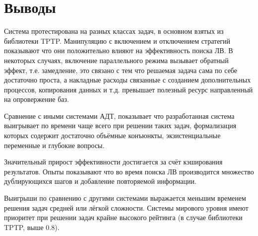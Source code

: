 \section{Выводы}
Система протестирована на разных классах задач, в основном взятых из библиотеки TPTP. Манипуляцию с включением и отключением стратегий показывают что они положительно влияют на эффективность поиска ЛВ. В некоторых случаях, включение параллельного режима вызывает обратный эффект, т.е. замедление, это связано с тем что решаемая задача сама по себе достаточно проста, а  накладные расходы связанные с созданием дополнительных процессов, копирования данных и т.д. превышает полезный ресурс направленный на опровержение баз.

Сравнение с иными системами АДТ, показывает что разработанная система выигрывает по времени чаще всего при решении таких задач, формализация которых содержит достаточно объёмные конъюнкты, экзистенциальные переменные и глубокие вопросы.

Значительный прирост эффективности достигается за счёт кэширования результатов. Опыты показывают что во время поиска ЛВ производится множество дублирующихся шагов и добавление повторяемой информации.

Выигрыши по сравнению с другими системами выражается меньшим временем решения задач средней или лёгкой сложности. Системы мирового уровня имеют приоритет при решении задач крайне высокого рейтинга (в случае библиотеки TPTP, выше 0.8).




